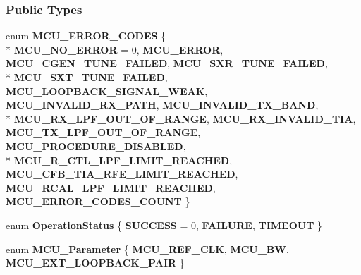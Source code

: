 \subsubsection*{Public Types}
\begin{DoxyCompactItemize}
\item 
enum {\bf M\+C\+U\+\_\+\+E\+R\+R\+O\+R\+\_\+\+C\+O\+D\+ES} \{ \\*
{\bf M\+C\+U\+\_\+\+N\+O\+\_\+\+E\+R\+R\+OR} = 0, 
{\bf M\+C\+U\+\_\+\+E\+R\+R\+OR}, 
{\bf M\+C\+U\+\_\+\+C\+G\+E\+N\+\_\+\+T\+U\+N\+E\+\_\+\+F\+A\+I\+L\+ED}, 
{\bf M\+C\+U\+\_\+\+S\+X\+R\+\_\+\+T\+U\+N\+E\+\_\+\+F\+A\+I\+L\+ED}, 
\\*
{\bf M\+C\+U\+\_\+\+S\+X\+T\+\_\+\+T\+U\+N\+E\+\_\+\+F\+A\+I\+L\+ED}, 
{\bf M\+C\+U\+\_\+\+L\+O\+O\+P\+B\+A\+C\+K\+\_\+\+S\+I\+G\+N\+A\+L\+\_\+\+W\+E\+AK}, 
{\bf M\+C\+U\+\_\+\+I\+N\+V\+A\+L\+I\+D\+\_\+\+R\+X\+\_\+\+P\+A\+TH}, 
{\bf M\+C\+U\+\_\+\+I\+N\+V\+A\+L\+I\+D\+\_\+\+T\+X\+\_\+\+B\+A\+ND}, 
\\*
{\bf M\+C\+U\+\_\+\+R\+X\+\_\+\+L\+P\+F\+\_\+\+O\+U\+T\+\_\+\+O\+F\+\_\+\+R\+A\+N\+GE}, 
{\bf M\+C\+U\+\_\+\+R\+X\+\_\+\+I\+N\+V\+A\+L\+I\+D\+\_\+\+T\+IA}, 
{\bf M\+C\+U\+\_\+\+T\+X\+\_\+\+L\+P\+F\+\_\+\+O\+U\+T\+\_\+\+O\+F\+\_\+\+R\+A\+N\+GE}, 
{\bf M\+C\+U\+\_\+\+P\+R\+O\+C\+E\+D\+U\+R\+E\+\_\+\+D\+I\+S\+A\+B\+L\+ED}, 
\\*
{\bf M\+C\+U\+\_\+\+R\+\_\+\+C\+T\+L\+\_\+\+L\+P\+F\+\_\+\+L\+I\+M\+I\+T\+\_\+\+R\+E\+A\+C\+H\+ED}, 
{\bf M\+C\+U\+\_\+\+C\+F\+B\+\_\+\+T\+I\+A\+\_\+\+R\+F\+E\+\_\+\+L\+I\+M\+I\+T\+\_\+\+R\+E\+A\+C\+H\+ED}, 
{\bf M\+C\+U\+\_\+\+R\+C\+A\+L\+\_\+\+L\+P\+F\+\_\+\+L\+I\+M\+I\+T\+\_\+\+R\+E\+A\+C\+H\+ED}, 
{\bf M\+C\+U\+\_\+\+E\+R\+R\+O\+R\+\_\+\+C\+O\+D\+E\+S\+\_\+\+C\+O\+U\+NT}
 \}
\item 
enum {\bf Operation\+Status} \{ {\bf S\+U\+C\+C\+E\+SS} = 0, 
{\bf F\+A\+I\+L\+U\+RE}, 
{\bf T\+I\+M\+E\+O\+UT}
 \}
\item 
enum {\bf M\+C\+U\+\_\+\+Parameter} \{ {\bf M\+C\+U\+\_\+\+R\+E\+F\+\_\+\+C\+LK}, 
{\bf M\+C\+U\+\_\+\+BW}, 
{\bf M\+C\+U\+\_\+\+E\+X\+T\+\_\+\+L\+O\+O\+P\+B\+A\+C\+K\+\_\+\+P\+A\+IR}
 \}
\end{DoxyCompactItemize}
